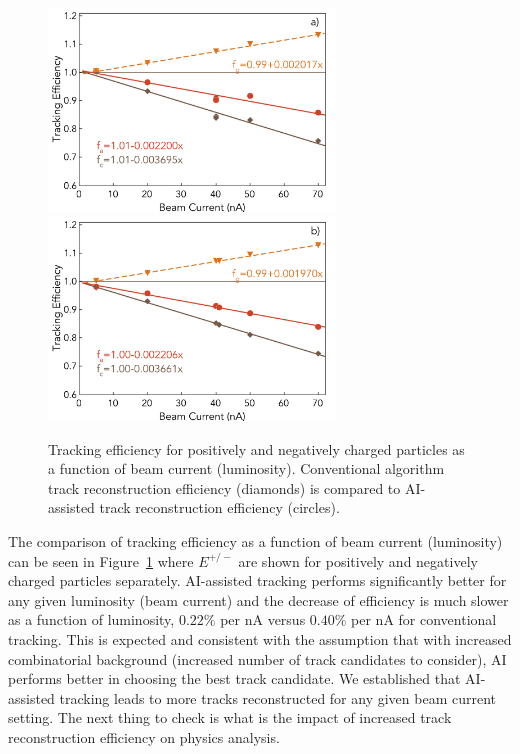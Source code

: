  \begin{figure}[!ht]
\begin{center}
 \includegraphics[width=3.0in]{images/figure_lscan_pos.pdf}
 \includegraphics[width=3.0in]{images/figure_lscan_neg.pdf}
\caption {Tracking efficiency for positively and negatively charged particles as a function 
of beam current (luminosity).  Conventional algorithm track reconstruction efficiency 
(diamonds) is compared to AI-assisted track reconstruction efficiency (circles). }
 \label{lumi:scan}
 \end{center}
\end{figure}

The comparison of tracking efficiency as a function of beam current (luminosity) can be 
seen in Figure~\ref{lumi:scan} where $E^{+/-}$ are shown for positively and negatively charged 
particles separately. AI-assisted tracking performs significantly better for any given luminosity 
(beam current) and the decrease of efficiency is much slower as a function of luminosity, $0.22\%$ 
per nA versus $0.40\%$ per nA for conventional tracking. This is expected and consistent with the 
assumption that with increased combinatorial background (increased number of track candidates 
to consider), AI performs better in choosing the best track candidate. We established that AI-assisted
tracking leads to more tracks reconstructed for any given beam current setting. The next thing to 
check is what is the impact of increased track reconstruction efficiency on physics analysis.

